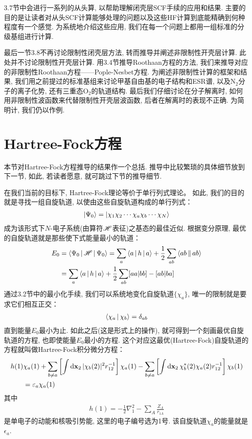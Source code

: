 3.7节中会进行一系列的从头算, 以帮助理解闭壳层SCF手续的应用和结果. 
主要的目的是让读者对从头SCF计算能够处理的问题以及这些HF计算到底能精确到何种程度有一个感觉. 
为系统地介绍这些应用, 
我们在每一个问题上都用一组标准的分级基组进行计算.

最后一节3.8不再讨论限制性闭壳层方法, 
转而推导并阐述非限制性开壳层计算. 
此处并不讨论限制性开壳层计算. 
用3.4节推导Roothaan方程的方法, 
我们来推导对应的非限制性Roothaan方程——Pople-Nesbet方程. 
为阐述非限制性计算的框架和结果, 
我们用之前提过的标准基组来讨论甲基自由基的电子结构和ESR谱, 
以及$\mathrm{N}_2$分子的离子化势, 
还有三重态$\mathrm{O}_2$的轨道结构. 
最后我们仔细讨论在分子解离时, 
如何用非限制性波函数来代替限制性开壳层波函数, 
后者在解离时的表现不正确. 
为简明计, 
我们仍以作例.


\section{Hartree-Fock方程}
本节对Hartree-Fock方程推导的结果作一个总括. 
推导中比较繁琐的具体细节放到下一节, 
如此, 
若读者愿意, 
就可跳过下节的推导细节. 


在我们当前的目标下, 
Hartree-Fock理论等价于单行列式理论。
如此, 我们的目的就是寻找一组自旋轨道, 
以使由这些自旋轨道构成的单行列式：
\begin{align}
	\Ket{\Psi_0} = \Ket{\chi_1\chi_2\cdots\chi_a\chi_b\cdots\chi_N}
\end{align}
成为该形式下$N$-电子系统(由算符$\mathscr{H}$表征)之基态的最佳近似. 
根据变分原理, 
最优的自旋轨道就是那些使下式能量最小的轨道：
\begin{align}
	E_0 & = \Braket{\Psi_0|\mathscr{H}|\Psi_0} = \sum_a\Braket{a|h|a} + \frac{1}{2}\sum_{ab}\Braket{ab||ab}\notag \\
	& = \sum_a\Braket{a|h|a} + \frac{1}{2}\sum_{ab}[aa|bb]-[ab|ba]
\end{align}
通过3.2节中的最小化手续, 
我们可以系统地变化自旋轨道$\{\chi_a\}$, 
唯一的限制就是要求它们相互正交：
\begin{align}
	\Braket{\chi_a|\chi_b} = \delta_{ab}
\end{align} 
直到能量$E_0$最小为止. 
如此之后(这是形式上的操作), 
就可得到一个刻画最优自旋轨道的方程, 
也即使能量$E_0$最小的方程. 
这个对应这最优(Hartree-Fock)自旋轨道的方程就叫做Hartree-Fock积分微分方程：
\begin{align}
	\label{3.4}
	h(1)&\chi_a(1) + \sum_{b\neq a}\left[ \int\dd{x}_2\,|\chi_b(2)|^2 r_{12}^{-1} \right]\chi_a(1) - \sum_{b\neq a}\left[ \int\dd{x}_2\,\chi_b^*(2)\chi_a(2) r_{12}^{-1} \right]\chi_b(1)\notag\\
	&=\epsilon_a\chi_a(1)
\end{align}
其中
\begin{align}
	h(1) = -\frac{1}{2}\nabla_1^2 - \sum_A\frac{Z_A}{r_{1A}}
\end{align}
是单电子的动能和核吸引势能, 
这里的电子编号选为1号. 
该自旋轨道$\chi_a$的能量就是$\epsilon_a$.


